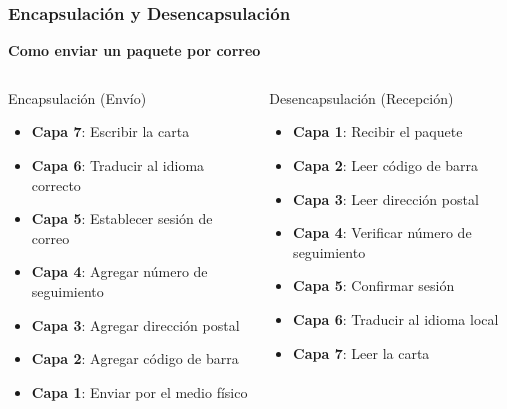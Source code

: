 \documentclass[aspectratio=169]{beamer}
\begin{document}
            \begin{frame}
            \frametitle{Encapsulación y Desencapsulación}
            
            \begin{center}
            \Large \textbf{Como enviar un paquete por correo}
            \end{center}
            
            \begin{columns}
            \begin{block}{Encapsulación (Envío)}
            \begin{itemize}
            \item<1-> \textbf{Capa 7}: Escribir la carta
            \item<2-> \textbf{Capa 6}: Traducir al idioma correcto
            \item<3-> \textbf{Capa 5}: Establecer sesión de correo
            \item<4-> \textbf{Capa 4}: Agregar número de seguimiento
            \item<5-> \textbf{Capa 3}: Agregar dirección postal
            \item<6-> \textbf{Capa 2}: Agregar código de barra
            \item<7-> \textbf{Capa 1}: Enviar por el medio físico
            \end{itemize}
            \end{block}
            
            \begin{block}{Desencapsulación (Recepción)}
            \begin{itemize}
            \item<1-> \textbf{Capa 1}: Recibir el paquete
            \item<2-> \textbf{Capa 2}: Leer código de barra
            \item<3-> \textbf{Capa 3}: Leer dirección postal
            \item<4-> \textbf{Capa 4}: Verificar número de seguimiento
            \item<5-> \textbf{Capa 5}: Confirmar sesión
            \item<6-> \textbf{Capa 6}: Traducir al idioma local
            \item<7-> \textbf{Capa 7}: Leer la carta
            \end{itemize}
            \end{block}
            \end{columns}
            \end{frame}
            
\end{document}
